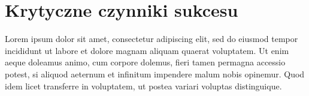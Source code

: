 \chapter{Krytyczne czynniki sukcesu}
\label{chap:trzeci}

Lorem ipsum dolor sit amet, consectetur adipiscing elit, sed do eiusmod tempor incididunt ut labore et dolore magnam aliquam quaerat voluptatem. Ut enim aeque doleamus animo, cum corpore dolemus, fieri tamen permagna accessio potest, si aliquod aeternum et infinitum impendere malum nobis opinemur. Quod idem licet transferre in voluptatem, ut postea variari voluptas distinguique.